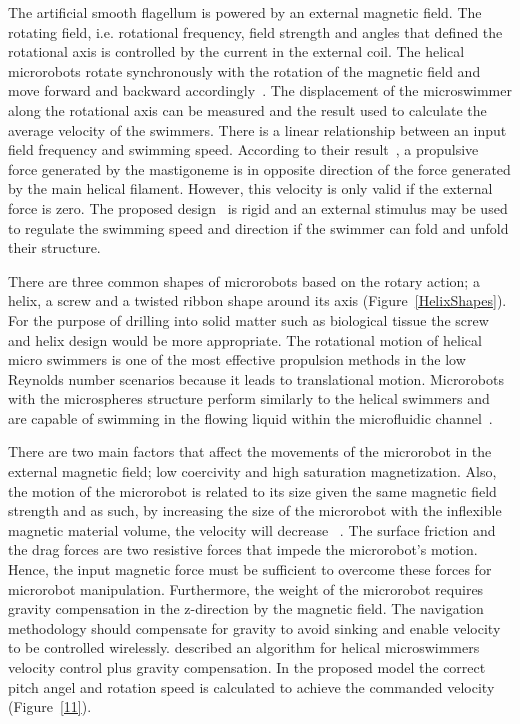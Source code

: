 \documentclass[12pt,a4paper,titlepage]{report}
\begin{document}
The artificial smooth flagellum is powered by an external magnetic field. 
 The rotating field, i.e. rotational frequency, field strength and angles that 
defined the rotational axis is controlled by the current in the external coil. The helical microrobots rotate 
synchronously with the rotation of the magnetic field and move forward and backward accordingly~\citep{tottori2013artificial}. 
The displacement of the microswimmer along the rotational axis can be measured and the result 
used to calculate the average velocity of the swimmers. There is a linear relationship between an input 
field frequency and swimming speed. According to their result~\citep{tottori2013artificial}, a propulsive force generated by 
the mastigoneme is in opposite direction of the force generated by the main helical filament. 
However, this velocity is only valid if the external force is zero. The proposed 
design~\citep{tottori2013artificial} is rigid and an external stimulus may be used to regulate the swimming
 speed and direction if the swimmer can fold and unfold their structure. 



There are three common shapes of microrobots 
based on the rotary action; a helix, a screw and a twisted ribbon shape around its
 axis (Figure~\ref{HelixShapes}). For the purpose of drilling into solid matter such as biological tissue the screw and helix 
design would be more appropriate. The rotational motion of helical micro
 swimmers is one of the most effective propulsion methods in the low Reynolds number scenarios 
because it leads to translational motion. Microrobots with the microspheres structure perform similarly 
to the helical swimmers and are capable of swimming in the flowing liquid within the microfluidic channel~\citep{kim2013fabrication}. 



There are two main factors that affect the movements of the microrobot in the external magnetic
 field; low coercivity and high saturation magnetization. Also, the motion of the microrobot is related to 
its size given the same magnetic field strength and as such, by increasing the size of the microrobot with the inflexible magnetic material
 volume, the velocity will decrease ~\citep{kim2013fabrication}. 
The surface friction and the drag forces are two resistive forces that impede the microrobot\rq{}s 
motion. Hence, the input magnetic force must be sufficient to overcome these forces for microrobot 
manipulation. Furthermore, the weight of the microrobot requires gravity compensation in the z-direction by 
the magnetic field. The navigation methodology should compensate for gravity to avoid sinking and enable velocity to be 
controlled wirelessly. \citeauthor{mahoney2011velocity} described an algorithm for helical microswimmers velocity 
control plus gravity compensation. In the proposed model the correct pitch angel and 
rotation speed is calculated to achieve the commanded velocity (Figure~\ref{11}).
\end{document}
